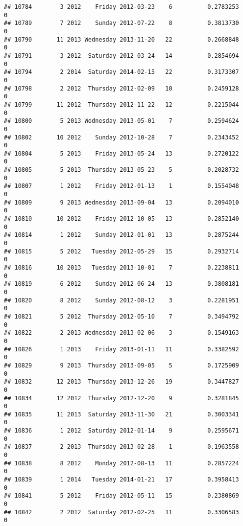\documentclass[
]{article}
\begin{document}
\begin{verbatim}
## 10784        3 2012    Friday 2012-03-23    6          0.2783253             0
## 10789        7 2012    Sunday 2012-07-22    8          0.3813730             0
## 10790       11 2013 Wednesday 2013-11-20   22          0.2668848             0
## 10791        3 2012  Saturday 2012-03-24   14          0.2854694             0
## 10794        2 2014  Saturday 2014-02-15   22          0.3173307             0
## 10798        2 2012  Thursday 2012-02-09   10          0.2459128             0
## 10799       11 2012  Thursday 2012-11-22   12          0.2215044             0
## 10800        5 2013 Wednesday 2013-05-01    7          0.2594624             0
## 10802       10 2012    Sunday 2012-10-28    7          0.2343452             0
## 10804        5 2013    Friday 2013-05-24   13          0.2720122             0
## 10805        5 2013  Thursday 2013-05-23    5          0.2028732             0
## 10807        1 2012    Friday 2012-01-13    1          0.1554048             0
## 10809        9 2013 Wednesday 2013-09-04   13          0.2094010             0
## 10810       10 2012    Friday 2012-10-05   13          0.2852140             0
## 10814        1 2012    Sunday 2012-01-01   13          0.2875244             0
## 10815        5 2012   Tuesday 2012-05-29   15          0.2932714             0
## 10816       10 2013   Tuesday 2013-10-01    7          0.2238811             0
## 10819        6 2012    Sunday 2012-06-24   13          0.3808181             0
## 10820        8 2012    Sunday 2012-08-12    3          0.2281951             0
## 10821        5 2012  Thursday 2012-05-10    7          0.3494792             0
## 10822        2 2013 Wednesday 2013-02-06    3          0.1549163             0
## 10826        1 2013    Friday 2013-01-11   11          0.3382592             0
## 10829        9 2013  Thursday 2013-09-05    5          0.1725909             0
## 10832       12 2013  Thursday 2013-12-26   19          0.3447827             0
## 10834       12 2012  Thursday 2012-12-20    9          0.3281845             0
## 10835       11 2013  Saturday 2013-11-30   21          0.3003341             0
## 10836        1 2012  Saturday 2012-01-14    9          0.2595671             0
## 10837        2 2013  Thursday 2013-02-28    1          0.1963558             0
## 10838        8 2012    Monday 2012-08-13   11          0.2857224             0
## 10839        1 2014   Tuesday 2014-01-21   17          0.3958413             0
## 10841        5 2012    Friday 2012-05-11   15          0.2380869             0
## 10842        2 2012  Saturday 2012-02-25   11          0.3306583             0

\end{verbatim}
\end{document}
